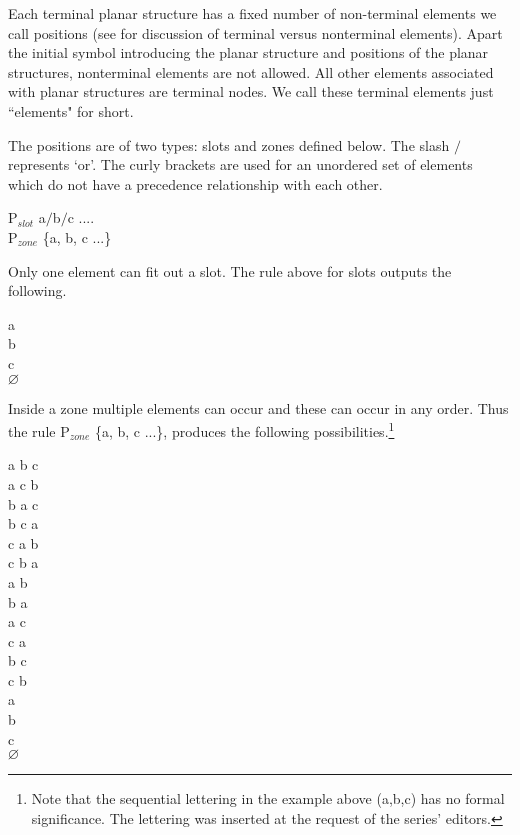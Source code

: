 \documentclass[output=paper,hidelinks]{langscibook}
\begin{document}
Each terminal planar structure has a fixed number of non-terminal elements we call positions (see \cite{partee1990mathematical} for discussion of terminal versus nonterminal elements). Apart the initial symbol introducing the planar structure and positions of the planar structures, nonterminal elements are not allowed. All other elements associated with planar structures are terminal nodes. We call these terminal elements just ``elements" for short.

The positions are of two types: slots and zones defined below. The slash $/$ represents `or'. The curly brackets are used for an unordered set of elements which do not have a precedence relationship with each other.

\ea \label{slotsandzones}
        \ea P$_{slot}$ \rightarrow {} a$/$b$/$c .... \\  
        \ex P$_{zone}$ \rightarrow {} \{a, b, c ...\}
    \z 
\z 

Only one element can fit out a slot. The rule above for slots outputs the following.

\ea \label{slotoutput}
    \ea a \\
    \ex b \\
    \ex c \\
    \ex $\varnothing$ \\
\z
\z  

Inside a zone multiple elements can occur and these can occur in any order. Thus the rule P$_{zone}$ \rightarrow {} \{a, b, c ...\}, produces the following possibilities.\footnote{Note that the sequential lettering in the example above (a,b,c) has no formal significance. The lettering was inserted at the request of the series' editors.}

\ea \label{zoneoutput}
    \ea a b c \\
    \ex a c b  \\
    \ex b a c \\
    \ex b c a \\ 
    \ex c a b \\
    \ex c b a \\
    \ex a b \\
    \ex b a \\ 
    \ex a c \\ 
    \ex c a \\
    \ex b c \\
    \ex c b \\
    \ex a \\
    \ex b \\
    \ex c \\
    \ex $\varnothing$ \\
    \z
\z 
    
\end{document}
